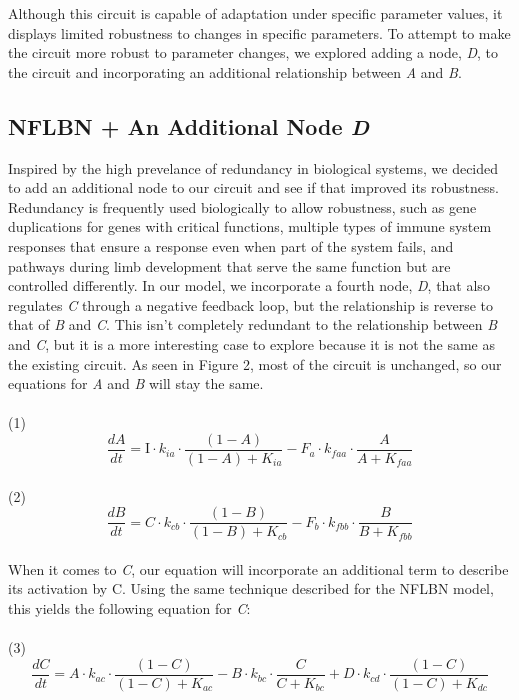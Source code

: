\documentclass{article}
\begin{document}
Although this circuit is capable of adaptation under specific parameter values, it displays limited robustness to changes in specific parameters. To attempt to make the circuit more robust to parameter changes, we explored adding a node, \textit{D}, to the circuit and incorporating an additional relationship between \textit{A} and \textit{B}. 

\subsection{NFLBN + An Additional Node \textit{D}}

Inspired by the high prevelance of redundancy in biological systems, we decided to add an additional node to our circuit and see if that improved its robustness. Redundancy is frequently used biologically to allow robustness, such as gene duplications for genes with critical functions, multiple types of immune system responses that ensure a response even when part of the system fails, and pathways during limb development that serve the same function but are controlled differently. In our model, we incorporate a fourth node, \textit{D}, that also regulates \textit{C} through a negative feedback loop, but the relationship is reverse to that of \textit{B} and \textit{C}. This isn't completely redundant to the relationship between \textit{B} and \textit{C}, but it is a more interesting case to explore because it is not the same as the existing circuit. As seen in Figure 2, most of the circuit is unchanged, so our equations for \textit{A} and \textit{B} will stay the same. 
\\
\\
(1)
\[
\frac{dA}{dt} = \text{I} \cdot k_{ia} \cdot \frac{(1 - A)}{(1 - A) + K_{ia}} - F_a \cdot k_{faa} \cdot \frac{A}{A + K_{faa}}
\]
\\
(2)
\[
\frac{dB}{dt} = C \cdot k_{cb} \cdot \frac{(1 - B)}{(1 - B) + K_{cb}} - F_b \cdot k_{fbb} \cdot \frac{B}{B + K_{fbb}}
\]
\\

When it comes to \textit{C}, our equation will incorporate an additional term to describe its activation by C. Using the same technique described for the NFLBN model, this yields the following equation for \textit{C}:
\\
\\
(3)
\[
\frac{dC}{dt} = A \cdot k_{ac} \cdot \frac{(1 - C)}{(1 - C) + K_{ac}} - B \cdot k_{bc} \cdot \frac{C}{C + K_{bc}} + D \cdot k_{cd} \cdot \frac{(1 - C)}{(1 - C) + K_{dc}}
\]
\end{document}
